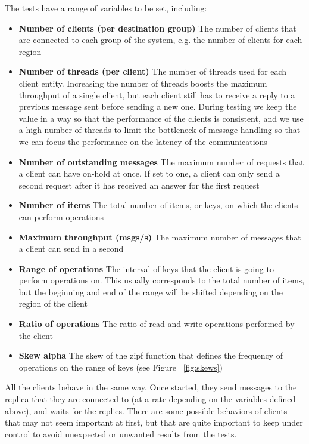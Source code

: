 The tests have a range of variables to be set, including:
\begin{itemize}
  \item \textbf{Number of clients (per destination group)} The number of clients that are connected to each group of the system, e.g. the number of clients for each region
  \item \textbf{Number of threads (per client)} The number of threads used for each client entity. Increasing the number of threads boosts the maximum throughput of a single client, but each client still has to receive a reply to a previous message sent before sending a new one. During testing we keep the value in a way so that the performance of the clients is consistent, and we use a high number of threads to limit the bottleneck of message handling so that we can focus the performance on the latency of the communications
  \item \textbf{Number of outstanding messages} The maximum number of requests that a client can have on-hold at once. If set to one, a client can only send a second request after it has received an answer for the first request
  \item \textbf{Number of items} The total number of items, or keys, on which the clients can perform operations
  \item \textbf{Maximum throughput (msgs/s)} The maximum number of messages that a client can send in a second
  \item \textbf{Range of operations} The interval of keys that the client is going to perform operations on. This usually corresponds to the total number of items, but the beginning and end of the range will be shifted depending on the region of the client
  \item \textbf{Ratio of operations} The ratio of read and write operations performed by the client
  \item \textbf{Skew alpha} The skew of the zipf function that defines the frequency of operations on the range of keys (see Figure ~\ref{fig:skews})
\end{itemize}

All the clients behave in the same way. Once started, they send messages to the replica that they are connected to (at a rate depending on the variables defined above), and waits for the replies. There are some possible behaviors of clients that may not seem important at first, but that are quite important to keep under control to avoid unexpected or unwanted results from the tests.

